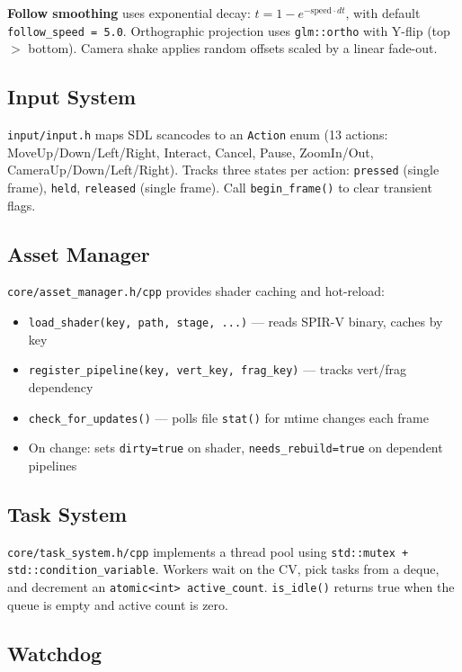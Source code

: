 \documentclass[11pt,a4paper]{article}
\begin{document}
\textbf{Follow smoothing} uses exponential decay: $t = 1 - e^{-\text{speed} \cdot dt}$, with default \texttt{follow\_speed = 5.0}. Orthographic projection uses \texttt{glm::ortho} with Y-flip (top $>$ bottom). Camera shake applies random offsets scaled by a linear fade-out.

\subsection{Input System}

\texttt{input/input.h} maps SDL scancodes to an \texttt{Action} enum (13 actions: MoveUp/Down/Left/Right, Interact, Cancel, Pause, ZoomIn/Out, CameraUp/Down/Left/Right). Tracks three states per action: \texttt{pressed} (single frame), \texttt{held}, \texttt{released} (single frame). Call \texttt{begin\_frame()} to clear transient flags.

\subsection{Asset Manager}
\label{sec:asset}

\texttt{core/asset\_manager.h/cpp} provides shader caching and hot-reload:
\begin{itemize}
  \item \texttt{load\_shader(key, path, stage, ...)} --- reads SPIR-V binary, caches by key
  \item \texttt{register\_pipeline(key, vert\_key, frag\_key)} --- tracks vert/frag dependency
  \item \texttt{check\_for\_updates()} --- polls file \texttt{stat()} for mtime changes each frame
  \item On change: sets \texttt{dirty=true} on shader, \texttt{needs\_rebuild=true} on dependent pipelines
\end{itemize}

\subsection{Task System}

\texttt{core/task\_system.h/cpp} implements a thread pool using \texttt{std::mutex + std::condition\_variable}. Workers wait on the CV, pick tasks from a deque, and decrement an \texttt{atomic<int> active\_count}. \texttt{is\_idle()} returns true when the queue is empty and active count is zero.

\subsection{Watchdog}
\end{document}
